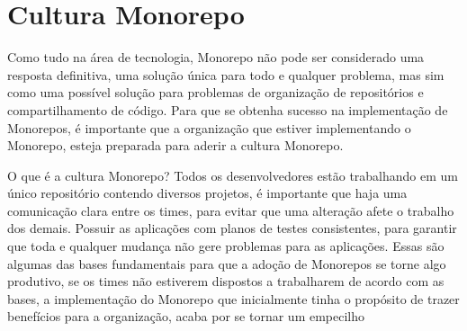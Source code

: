 \section{Cultura Monorepo}

Como tudo na área de tecnologia, Monorepo não pode ser considerado uma resposta definitiva, uma solução única para todo e qualquer problema, mas sim como uma possível solução para problemas de organização de repositórios e compartilhamento de código. Para que se obtenha sucesso na implementação de Monorepos, é importante que a organização que estiver implementando o Monorepo, esteja preparada para aderir a cultura Monorepo.

O que é a cultura Monorepo? Todos os desenvolvedores estão trabalhando em um único repositório contendo diversos projetos, é importante que haja uma comunicação clara entre os times, para evitar que uma alteração afete o trabalho dos demais. Possuir as aplicações com planos de testes consistentes, para garantir que toda e qualquer mudança não gere problemas para as aplicações. Essas são algumas das bases fundamentais para que a adoção de Monorepos se torne algo produtivo, se os times não estiverem dispostos a trabalharem de acordo com as bases, a implementação do Monorepo que inicialmente tinha o propósito de trazer benefícios para a organização, acaba por se tornar um empecilho 

